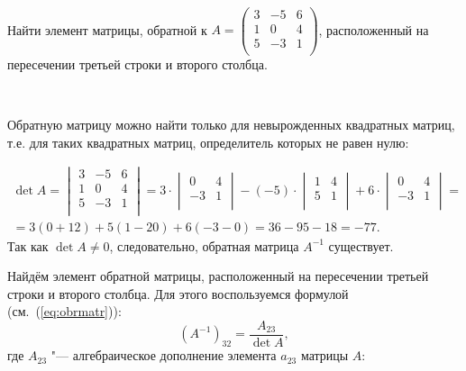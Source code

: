 \documentclass[10pt]{article}
\numberwithin{primer}{section}
\numberwithin{equation}{section}
\begin{document}
\noindent\hrulefill\,\,\hrulefill\vspace{4pt}\\
Найти элемент матрицы, обратной к $A=\begin{pmatrix}
3 & -5 & 6\\
1 & 0 & 4\\
5 & -3 & 1\\
\end{pmatrix}$, расположенный на пересечении третьей строки и второго столбца.\vspace{4pt}

\noindent{}\,\hrulefill\vspace{4pt}

Обратную матрицу можно найти только для невырожденных квадратных матриц, т.е. для таких квадратных матриц, определитель которых не равен нулю:

\begin{multline*}
\det A=\begin{vmatrix}
3 & -5 & 6\\
1 & 0 & 4\\
5 & -3 & 1\\
\end{vmatrix}=3\cdot\begin{vmatrix}
0 & 4\\
-3 & 1\\
\end{vmatrix}-(-5)\cdot\begin{vmatrix}
1 &  4\\
5 & 1\\
\end{vmatrix}
+6\cdot\begin{vmatrix}
0 & 4\\
-3 & 1\\
\end{vmatrix}=\\
=3(0+12)+5(1-20)+6(-3-0)=36-95-18=-77.
\end{multline*}
Так как $\det A\neq0$, следовательно, обратная матрица $A^{-1}$ существует.

Найдём элемент обратной матрицы, расположенный на пересечении третьей строки и второго столбца. Для этого воспользуемся формулой (см.~(\ref{eq:obrmatr})):
\begin{equation*}
\left(A^{-1}\right)_{32}=\frac{A_{23}}{\det A},
\end{equation*}
где $A_{23}$ "--- алгебраическое дополнение элемента $a_{23}$ матрицы $A$:
\end{document}
